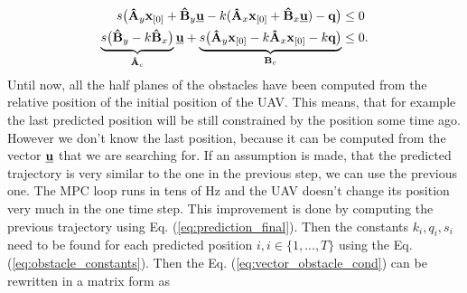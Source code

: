 \documentclass[a4paper,11pt,titlepage]{article}
\newcommand{\uvec}{\textbf{\underline{u}}}
\begin{document}
\begin{equation}
\begin{split}
s\big(\textbf{\^A}_y \textbf{x}_{[0]} + \textbf{\^B}_y \uvec - k(\textbf{\^A}_x \textbf{x}_{[0]} + \textbf{\^B}_x \uvec) - \textbf{q}\big) &\leq 0 \\
\underbrace{s\big(\textbf{\^B}_y-k\textbf{\^B}_x\big)}_{\textbf{\^A}_c} \uvec +
\underbrace{s\big(\textbf{\^A}_y \textbf{x}_{[0]} - k\textbf{\^A}_x \textbf{x}_{[0]} -k\textbf{q}\big)}_{\textbf{B}_c} &\leq 0.
\end{split}
\end{equation}
Until now, all the half planes of the obstacles have been computed from the relative position of the initial position of the UAV. This means, that for example the last predicted position will be still constrained by the position some time ago. However we don't know the last position, because it can be computed from the vector $\uvec$ that we are searching for. If an assumption is made, that the predicted trajectory is very similar to the one in the previous step, we can use the previous one. The MPC loop runs in tens of Hz and the UAV doesn't change its position very much in the one time step. This improvement is done by computing the previous trajectory using Eq. (\ref{eq:prediction_final}). Then the constants $k_{i}, q_{i}, s_{i}$ need to be found for each predicted position $i, i\in\{1,...,T\}$ using the Eq. (\ref{eq:obstacle_constants}). Then the Eq. (\ref{eq:vector_obstacle_cond}) can be rewritten in a matrix form as
\end{document}
